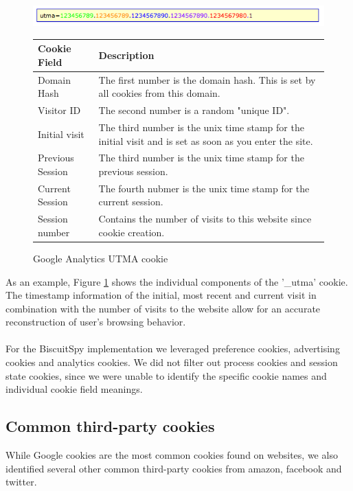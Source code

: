\begin{figure}[h]
\centering
\includegraphics[scale=0.8]{./diagrams/utma.png}

\begin{tabular}{ | l | p{12cm} |}
    \hline
  Cookie Field & Description \\ \hline
Domain Hash & The first number is the domain hash. This is set by all cookies from this domain. \\ \hline
Visitor ID & The second number is a random "unique ID". \\ \hline
Initial visit & The third number is the unix time stamp for the initial visit and is set as soon as you enter the site. \\ \hline
Previous Session & The third number is the unix time stamp for the previous session. \\ \hline
Current Session & The fourth nubmer is the unix time stamp for the current session. \\ \hline
Session number & Contains the number of visits to this website since cookie creation. \\ \hline
 \end{tabular}

\caption{Google Analytics UTMA cookie}
\label{fig:utma}

\end{figure}

As an example, Figure \ref{fig:utma} shows the individual components of the '\_utma' cookie. The timestamp information of the initial, most recent and current visit in combination with the number of visits to the website allow for an accurate reconstruction of user's browsing behavior. 
\\
\\
For the BiscuitSpy implementation we leveraged preference cookies, advertising cookies and analytics cookies. We did not filter out process cookies and session state cookies, since we were unable to identify the specific cookie names and individual cookie field meanings.


\subsection{Common third-party cookies}
While Google cookies are the most common cookies found on websites, we also identified several other common third-party cookies from amazon, facebook and twitter.

